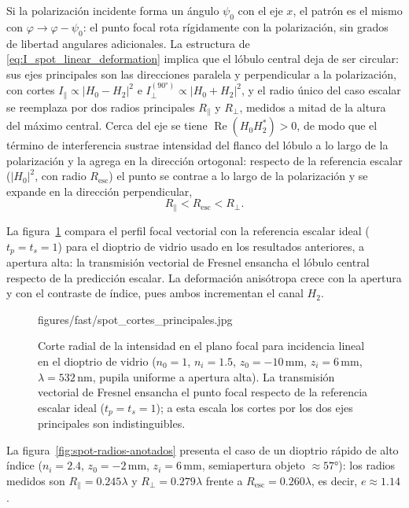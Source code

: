 Si la polarización incidente forma un ángulo $\psi_0$ con el eje $x$, el
patrón es el mismo con $\varphi\to\varphi-\psi_0$: el punto focal rota
rígidamente con la polarización, sin grados de libertad angulares adicionales.
La estructura de \eqref{eq:I_spot_linear_deformation} implica que el lóbulo
central deja de ser circular: sus ejes principales son las direcciones paralela
y perpendicular a la polarización, con cortes $I_\parallel\propto|H_0-H_2|^2$ e
$I_\perp^{(90°)}\propto|H_0+H_2|^2$, y el radio único del caso escalar se
reemplaza por dos radios principales $R_\parallel$ y $R_\perp$, medidos a mitad
de la altura del máximo central. Cerca del eje se tiene
$\operatorname{Re}(H_0H_2^*)>0$, de modo que el término de interferencia
sustrae intensidad del flanco del lóbulo a lo largo de la polarización y la
agrega en la dirección ortogonal: respecto de la referencia escalar
($|H_0|^2$, con radio $R_{\mathrm{esc}}$) el punto se contrae a lo largo de la
polarización y se expande en la dirección perpendicular,
\begin{equation}
  R_\parallel < R_{\mathrm{esc}} < R_\perp.
\label{eq:spot_radii_ordering}
\end{equation}

La figura~\ref{fig:spot-cortes-principales} compara el perfil focal
vectorial con la referencia escalar ideal ($t_p=t_s=1$) para el dioptrio de
vidrio usado en los resultados anteriores, a apertura alta: la transmisión
vectorial de Fresnel ensancha el lóbulo central respecto de la predicción
escalar. La deformación anisótropa crece con la apertura y con el contraste
de índice, pues ambos incrementan el canal $H_2$.

\begin{figure}[H]
  \centering
    {figures/fast/spot_cortes_principales.jpg}
  \caption{Corte radial de la intensidad en el plano focal para incidencia
  lineal en el dioptrio de vidrio ($n_0=1$, $n_i=1.5$, $z_0=-10\,\mathrm{mm}$,
  $z_i=6\,\mathrm{mm}$, $\lambda=532\,\mathrm{nm}$, pupila uniforme a apertura
  alta). La transmisión vectorial de Fresnel ensancha el punto focal respecto
  de la referencia escalar ideal ($t_p=t_s=1$); a esta escala los cortes por
  los dos ejes principales son indistinguibles.}
  \label{fig:spot-cortes-principales}
\end{figure}

La figura~\ref{fig:spot-radios-anotados}
presenta el caso de un dioptrio rápido de alto índice ($n_i=2.4$,
$z_0=-2\,\mathrm{mm}$, $z_i=6\,\mathrm{mm}$, semiapertura objeto
$\approx 57°$): los radios medidos son $R_\parallel=0.245\lambda$ y
$R_\perp=0.279\lambda$ frente a $R_{\mathrm{esc}}=0.260\lambda$, es decir,
$e\approx 1.14$.

